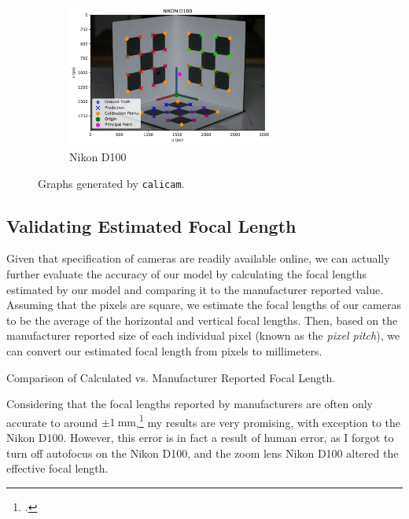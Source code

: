 \begin{figure}[H]
    \ContinuedFloat
    \centering
    \begin{subfigure}{\textwidth}
        \centering
        \includegraphics[width=0.75\textwidth]{assets/results/NIKON D100/graph.pdf}
        \caption{Nikon D100}
    \end{subfigure}
    \caption{Graphs generated by \texttt{calicam}.}
\end{figure}

\subsection{Validating Estimated Focal Length}
Given that specification of cameras are readily available online, we can actually further evaluate the accuracy of our model by calculating the focal lengths estimated by our model and comparing it to the manufacturer reported value. Assuming that the pixels are square, we estimate the focal lengths of our cameras to be the average of the horizontal and vertical focal lengths. Then, based on the manufacturer reported size of each individual pixel (known as the \emph{pixel pitch}), we can convert our estimated focal length from pixels to millimeters.

\begin{table}[H]
    \centering
    
    \caption{Comparison of Calculated vs. Manufacturer Reported Focal Length.}
\end{table}

Considering that the focal lengths reported by manufacturers are often only accurate to around $\pm \qty{1}{\milli\meter}$,\footcite{waynefAnswerAre2017} my results are very promising, with exception to the Nikon D100. However, this error is in fact a result of human error, as I forgot to turn off autofocus on the Nikon D100, and the zoom lens Nikon D100 altered the effective focal length.



